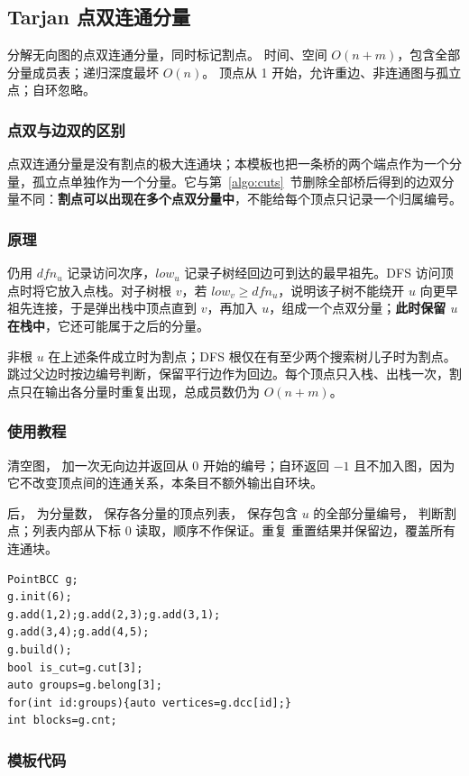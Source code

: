 \subsection{Tarjan 点双连通分量}
\label{algo:point-bcc}
\AlgorithmInfo
    {分解无向图的点双连通分量，同时标记割点。}
    {时间、空间 $O(n+m)$，包含全部分量成员表；递归深度最坏 $O(n)$。}
    {顶点从 1 开始，允许重边、非连通图与孤立点；自环忽略。}

\subsubsection*{点双与边双的区别}
点双连通分量是没有割点的极大连通块；本模板也把一条桥的两个端点作为一个分量，孤立点单独作为一个分量。它与第~\ref{algo:cuts}~节删除全部桥后得到的边双分量不同：\textbf{割点可以出现在多个点双分量中}，不能给每个顶点只记录一个归属编号。

\subsubsection*{原理}
仍用 $dfn_u$ 记录访问次序，$low_u$ 记录子树经回边可到达的最早祖先。DFS 访问顶点时将它放入点栈。对子树根 $v$，若 $low_v\geq dfn_u$，说明该子树不能绕开 $u$ 向更早祖先连接，于是弹出栈中顶点直到 $v$，再加入 $u$，组成一个点双分量；\textbf{此时保留 $u$ 在栈中}，它还可能属于之后的分量。

非根 $u$ 在上述条件成立时为割点；DFS 根仅在有至少两个搜索树儿子时为割点。跳过父边时按边编号判断，保留平行边作为回边。每个顶点只入栈、出栈一次，割点只在输出各分量时重复出现，总成员数仍为 $O(n+m)$。

\subsubsection*{使用教程}
 清空图， 加一次无向边并返回从 0 开始的编号；自环返回 $-1$ 且不加入图，因为它不改变顶点间的连通关系，本条目不额外输出自环块。

 后， 为分量数， 保存各分量的顶点列表， 保存包含 $u$ 的全部分量编号， 判断割点；列表内部从下标 0 读取，顺序不作保证。重复  重置结果并保留边，覆盖所有连通块。
\begin{lstlisting}[style=mtycpp,numbers=none]
PointBCC g;
g.init(6);
g.add(1,2);g.add(2,3);g.add(3,1);
g.add(3,4);g.add(4,5);
g.build();
bool is_cut=g.cut[3];
auto groups=g.belong[3];
for(int id:groups){auto vertices=g.dcc[id];}
int blocks=g.cnt;
\end{lstlisting}

\subsubsection*{模板代码}
